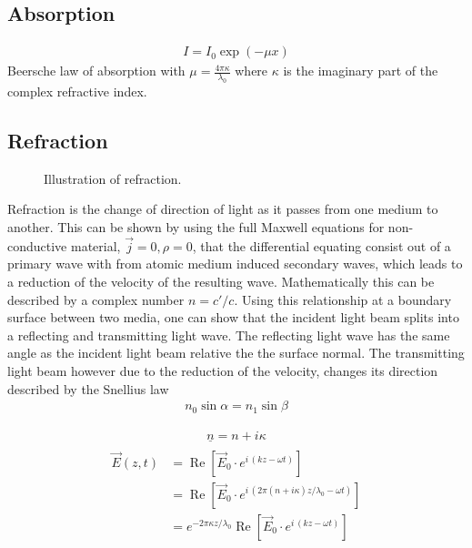\subsection{Absorption}
% 
\begin{align}
    I = I_0 \exp(-\mu x)
\end{align}
% 
Beersche law of absorption with $\mu = \frac{4\pi \kappa}{\lambda_0}$ where $\kappa$ is the imaginary part of the complex refractive index.
% 
\subsection{Refraction}
% 
\begin{figure}[!t]
\centering
\setlength{\tikzwidth}{\textwidth}
\label{fig:optic_refraction}
\caption{Illustration of refraction.}
\end{figure}
% 
Refraction is the change of direction of light as it passes from one medium to another.
This can be shown by using the full Maxwell equations  for non-conductive material, \ie{} $\vec{j} = 0, \rho = 0$, that the differential equating consist out of a primary wave with from atomic medium induced secondary waves, which leads to a reduction of the velocity of the resulting wave.
Mathematically this can be described by a complex number $n = c' / c$.
Using this relationship at a boundary surface between two media, one can show that the incident light beam splits into a reflecting and transmitting light wave.
The reflecting light wave has the same angle as the incident light beam relative the the surface normal.
The transmitting light beam however due to the reduction of the velocity, changes its direction described by the Snellius law
\begin{align}
    n_0 \sin \alpha = n_1 \sin \beta \label{eq:Snellius}
\end{align}

% 
\begin{align}
\underline{n} = n + i\kappa
\end{align}
% 
\begin{align}
\begin{split}
\vec{E}(z, t) &= \operatorname{Re}\! \left[\vec{E}_0 \cdot e^{i\, (kz - \omega t)}\right] \\
&= \operatorname{Re}\! \left[\vec{E}_0 \cdot e^{i\, (2\pi(n + i\kappa)z/\lambda_0 - \omega t)}\right] \\
&= e^{-2\pi \kappa z/\lambda_0} \operatorname{Re}\! \left[\vec{E}_0 \cdot e^{i\, (kz - \omega t)}\right]
\end{split}
\end{align}
% 
% 
% 
